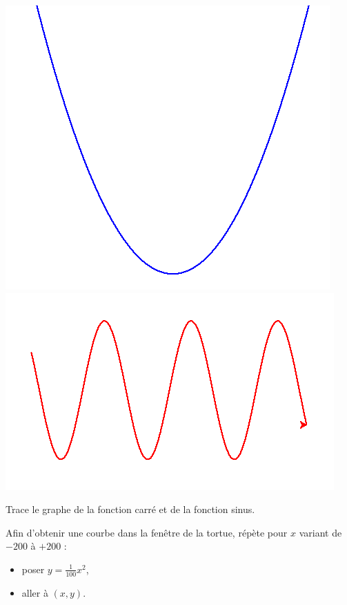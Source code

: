 \documentclass[11pt,class=report,crop=false]{standalone}
\begin{document}

\begin{activite}


\begin{center}
\includegraphics[scale=\myscale,scale=0.4]{ecran-tortue-3a}
\includegraphics[scale=\myscale,scale=0.4]{ecran-tortue-3b}
\end{center}

Trace le graphe de la fonction carré et de la fonction sinus.

Afin d'obtenir une courbe dans la fenêtre de la tortue, répète pour $x$ variant de $-200$ à $+200$ :
\begin{itemize}
  \item poser $y = \frac{1}{100} x^2$,
  \item aller à $(x,y)$.
\end{itemize}


\end{activite}
\end{document}
